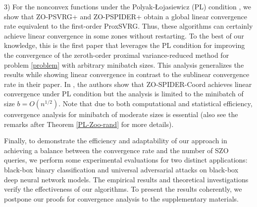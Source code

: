 \documentclass[iicol,sn-basic]{sn-jnl}
\theoremstyle{thmstyleone}%
\theoremstyle{thmstyletwo}%
\theoremstyle{thmstylethree}%
\begin{document}
3) For the nonconvex functions under the Polyak-Łojasiewicz (PL) condition \cite{polyak1963gradient}, we show that ZO-PSVRG+ and ZO-PSPIDER+
obtain a global linear convergence rate equivalent to the first-order ProxSVRG. Thus, these algorithms can certainly achieve linear convergence in some zones without restarting. To the best of
our knowledge, this is the first paper that leverages the PL condition for improving the convergence of the zeroth-order proximal variance-reduced method for problem \eqref{problem} with arbitrary minibatch sizes. This analysis generalizes the results \cite{duchi2015optimal} while showing linear convergence in contrast to the sublinear convergence rate in their paper.
In \cite{ji2019improved}, the authors show that  ZO-SPIDER-Coord achieves linear convergence under PL condition but the analysis is limited to the minibatch of size $b = O(n^{1/2})$. Note that due to both computational and statistical efficiency, convergence analysis for minibatch of moderate sizes is essential (also see the remarks after Theorem \ref{PL-Zoo-rand} for more details). 

Finally, to demonstrate the efficiency and adaptability of our approach in achieving a balance between the convergence rate and the number of SZO queries, we perform some
experimental evaluations for two distinct applications: black-box binary classification and universal adversarial
attacks on black-box deep neural network models. The empirical results and
theoretical investigations verify the effectiveness of our algorithms. To present the results coherently, 
we postpone our proofs for convergence analysis to the supplementary materials.
\end{document}

